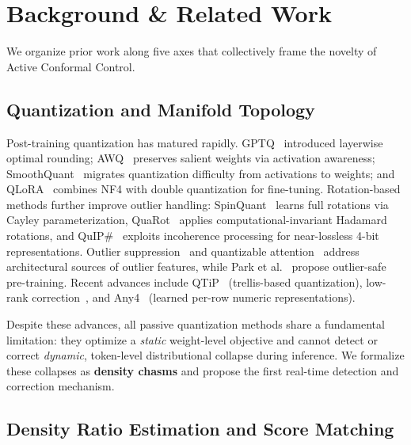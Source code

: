 \documentclass{uai2026}  %
\begin{document}
\section{Background \& Related Work}
\enlargethispage{2\baselineskip}
\label{sec:related}

We organize prior work along five axes that collectively frame the novelty of Active Conformal Control.

\subsection{Quantization and Manifold Topology}

Post-training quantization has matured rapidly.
GPTQ~\cite{frantar2022gptq} introduced layerwise optimal rounding;
AWQ~\cite{lin2023awq} preserves salient weights via activation awareness;
SmoothQuant~\cite{xiao2023smoothquant} migrates quantization difficulty from activations to weights;
and QLoRA~\cite{dettmers2023qlora} combines NF4 with double quantization for fine-tuning.
Rotation-based methods further improve outlier handling:
SpinQuant~\cite{dettmers2024spinquant} learns full rotations via Cayley parameterization,
QuaRot~\cite{ashkboos2024quarot} applies computational-invariant Hadamard rotations,
and QuIP\#~\cite{chee2024quip} exploits incoherence processing for near-lossless 4-bit representations.
Outlier suppression~\cite{wei2022outlier} and quantizable attention~\cite{bondarenko2023quantizable}
address architectural sources of outlier features,
while Park et al.~\cite{park2025outlier} propose outlier-safe pre-training.
Recent advances include QTiP~\cite{tseng2024qtip} (trellis-based quantization),
low-rank correction~\cite{scetbon2025lowrank}, and
Any4~\cite{dettmers2024any4} (learned per-row numeric representations).

Despite these advances, all passive quantization methods share a fundamental limitation:
they optimize a \emph{static} weight-level objective and cannot detect or correct
\emph{dynamic}, token-level distributional collapse during inference.
We formalize these collapses as \textbf{density chasms} and propose the first
real-time detection and correction mechanism.

\subsection{Density Ratio Estimation and Score Matching}
\end{document}
